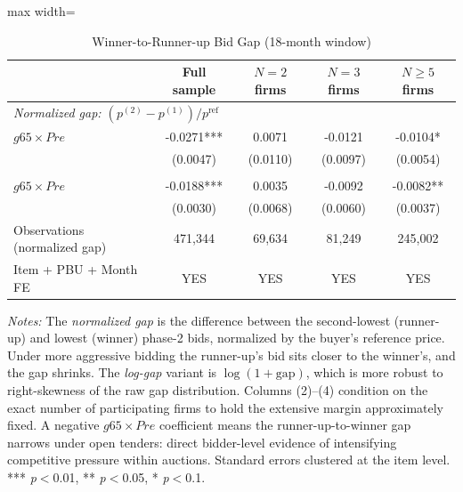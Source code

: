 \begin{table}[htbp]
\centering
\caption{Winner-to-Runner-up Bid Gap (18-month window)}
\label{tab:runnerup_gap}
\begin{adjustbox}{max width=\textwidth}
\begin{threeparttable}
\small
\begin{tabular}{lcccc}
\toprule
 & Full sample & $N=2$ firms & $N=3$ firms & $N \geq 5$ firms \\
\midrule
\multicolumn{5}{l}{\textit{Normalized gap: $(p^{(2)} - p^{(1)})/p^\text{ref}$}} \\
$g65 \times Pre$ & -0.0271*** & 0.0071 & -0.0121 & -0.0104* \\
 & (0.0047) & (0.0110) & (0.0097) & (0.0054) \\
\addlinespace
\multicolumn{5}{l}{\textit{Log-gap: $\log(1 + \text{normalized gap})$}} \\
$g65 \times Pre$ & -0.0188*** & 0.0035 & -0.0092 & -0.0082** \\
 & (0.0030) & (0.0068) & (0.0060) & (0.0037) \\
\addlinespace
Observations (normalized gap) & 471,344 & 69,634 & 81,249 & 245,002 \\
\midrule
Item + PBU + Month FE & YES & YES & YES & YES \\
\bottomrule
\end{tabular}
\begin{tablenotes}
\small
\item \textit{Notes:} The \textit{normalized gap} is the difference
between the second-lowest (runner-up) and lowest (winner) phase-2 bids,
normalized by the buyer's reference price. Under more aggressive bidding
the runner-up's bid sits closer to the winner's, and the gap shrinks.
The \textit{log-gap} variant is $\log(1 + \text{gap})$, which is more
robust to right-skewness of the raw gap distribution.
Columns (2)--(4) condition on the exact number of participating firms
to hold the extensive margin approximately fixed. A negative
$\mathit{g65}\times\mathit{Pre}$ coefficient means the runner-up-to-winner
gap narrows under open tenders: direct bidder-level evidence of
intensifying competitive pressure within auctions. Standard errors
clustered at the item level.
*** \textit{p}$<$0.01, ** \textit{p}$<$0.05, * \textit{p}$<$0.1.
\end{tablenotes}
\end{threeparttable}
\end{adjustbox}
\end{table}

